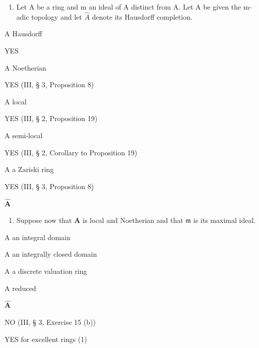 
\begin{enumerate}
\def\labelenumi{(\alph{enumi})}
\tightlist
\item
  Let A be a ring and m an ideal of A distinct from A. Let A be given the m-adic topology and let \(\hat{A}\) denote its Hausdorff completion.
\end{enumerate}

A Hausdorff

YES

A Noetherian

YES (III, § 3, Proposition 8)

A local

YES (III, § 2, Proposition 19)

A semi-local

YES (III, § 2, Corollary to Proposition 19)

A a Zariski ring

YES (III, § 3, Proposition 8)

\textbf{\(\hat{\mathbf{A}}\)}\par

\begin{enumerate}
\def\labelenumi{(\alph{enumi})}
\setcounter{enumi}{1}
\tightlist
\item
  Suppose now that \(\mathbf{A}\) is local and Noetherian and that \(\mathfrak{m}\) is its maximal ideal.
\end{enumerate}

A an integral domain

A an integrally closed domain

A a discrete valuation ring

A reduced

\textbf{\(\hat{\mathbf{A}}\)}\par

NO (III, § 3, Exercise 15 (b))

YES for excellent rings (1)


